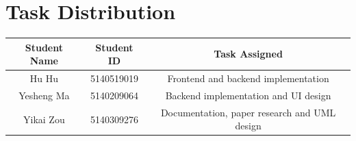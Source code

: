 \documentclass[12pt]{article}
\begin{document}
\section{Task Distribution}
\begin{table}[H]
	\centering
	\begin{tabular}{|c|c|c|}
		\hline
		Student Name & Student ID & Task Assigned \\
		\hline
		Hu Hu & 5140519019 & Frontend and  backend implementation  \\
		\hline
		Yesheng Ma & 5140209064 & Backend implementation and UI design\\
		\hline
		Yikai Zou & 5140309276 & Documentation, paper research and UML design\\
		\hline
	\end{tabular}
\end{table}
\end{document}
